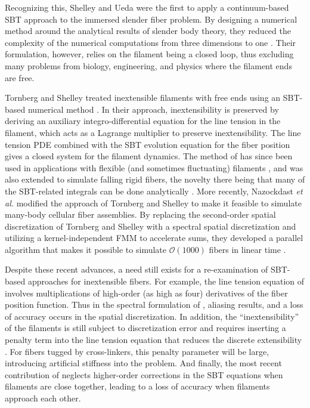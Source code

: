 Recognizing this, Shelley and Ueda were the first to apply a continuum-based SBT approach to the immersed slender fiber problem. By designing a numerical method around the analytical results of slender body theory, they reduced the complexity of the numerical computations from three dimensions to one \cite{shelley1996nonlocal, shelley2000stokesian}. Their formulation, however, relies on the filament being a closed loop, thus excluding many problems from biology, engineering, and physics where the filament ends are free. 

Tornberg and Shelley treated inextensible filaments with free ends using an SBT-based numerical method \cite{ts04}. In their approach, inextensibility is preserved by deriving an auxiliary integro-differential equation for the line tension in the filament, which acts as a Lagrange multiplier to preserve inextensibility. The line tension PDE combined with the SBT evolution equation for the fiber position gives a closed system for the filament dynamics. The method of \cite{ts04} has since been used in applications with flexible (and sometimes fluctuating) filaments  \cite{manikantan2013subdiffusive, young2009hydrodynamic}, and was also extended to simulate falling rigid fibers, the novelty there being that many of the SBT-related integrals can be done analytically \cite{tornberg2006numerical}. More recently, Nazockdast \textit{et al.} modified the approach of Tornberg and Shelley to make it feasible to simulate many-body cellular fiber assemblies. By replacing the second-order spatial discretization of Tornberg and Shelley with a spectral spatial discretization and utilizing a kernel-independent FMM to accelerate sums, they developed a parallel algorithm that makes it possible to simulate $\mathcal{O}(1000)$ fibers in linear time \cite{ehssan17}. 

Despite these recent advances, a need still exists for a re-examination of SBT-based approaches for inextensible fibers. For example, the line tension equation of \cite{ts04} involves multiplications of high-order (as high as four) derivatives of the fiber position function. Thus in the spectral formulation of \cite{ehssan17}, aliasing results, and a loss of accuracy occurs in the spatial discretization. In addition, the ``inextensibility'' of the filaments is still subject to discretization error and requires inserting a penalty term into the line tension equation that reduces the discrete extensibility \cite{ts04}. For fibers tugged by cross-linkers, this penalty parameter will be large, introducing artificial stiffness into the problem. And finally, the most recent contribution of \cite{ehssan17} neglects higher-order corrections in the SBT equations when filaments are close together, leading to a loss of accuracy when filaments approach each other. 

